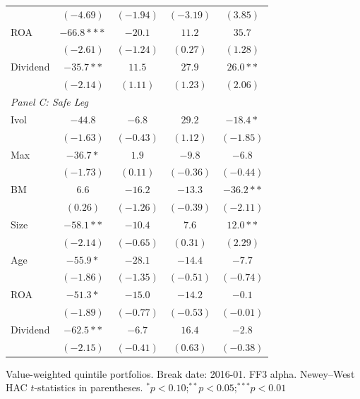 \begin{table}[htbp]
\begin{tabular}{l c c c c}
 & $(-4.69)$ & $(-1.94)$ & $(-3.19)$ & $(3.85)$ \\
ROA & $-66.8***$ & $-20.1$ & $11.2$ & $35.7$ \\
 & $(-2.61)$ & $(-1.24)$ & $(0.27)$ & $(1.28)$ \\
Dividend & $-35.7**$ & $11.5$ & $27.9$ & $26.0**$ \\
 & $(-2.14)$ & $(1.11)$ & $(1.23)$ & $(2.06)$ \\
\midrule
\multicolumn{5}{l}{\textit{Panel C: Safe Leg}} \\
Ivol & $-44.8$ & $-6.8$ & $29.2$ & $-18.4*$ \\
 & $(-1.63)$ & $(-0.43)$ & $(1.12)$ & $(-1.85)$ \\
Max & $-36.7*$ & $1.9$ & $-9.8$ & $-6.8$ \\
 & $(-1.73)$ & $(0.11)$ & $(-0.36)$ & $(-0.44)$ \\
BM & $6.6$ & $-16.2$ & $-13.3$ & $-36.2**$ \\
 & $(0.26)$ & $(-1.26)$ & $(-0.39)$ & $(-2.11)$ \\
Size & $-58.1**$ & $-10.4$ & $7.6$ & $12.0**$ \\
 & $(-2.14)$ & $(-0.65)$ & $(0.31)$ & $(2.29)$ \\
Age & $-55.9*$ & $-28.1$ & $-14.4$ & $-7.7$ \\
 & $(-1.86)$ & $(-1.35)$ & $(-0.51)$ & $(-0.74)$ \\
ROA & $-51.3*$ & $-15.0$ & $-14.2$ & $-0.1$ \\
 & $(-1.89)$ & $(-0.77)$ & $(-0.53)$ & $(-0.01)$ \\
Dividend & $-62.5**$ & $-6.7$ & $16.4$ & $-2.8$ \\
 & $(-2.15)$ & $(-0.41)$ & $(0.63)$ & $(-0.38)$ \\
\bottomrule
\end{tabular}
\vspace{4pt}
\begin{minipage}{0.9\textwidth}
\footnotesize
Value-weighted quintile portfolios. Break date: 2016-01. FF3 alpha.
Newey--West HAC $t$-statistics in parentheses.
$^{*}p<0.10$;\quad $^{**}p<0.05$;\quad $^{***}p<0.01$
\end{minipage}
\end{table}
